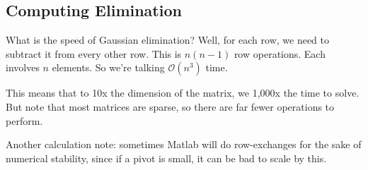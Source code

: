 \subsection{Computing Elimination}

What is the speed of Gaussian elimination? Well, for each row, we need
to subtract it from every other row. This is $n(n-1)$ row operations.
Each involves $n$ elements. So we're talking $\mathcal{O}(n^3)$ time.

This means that to 10x the dimension of the matrix, we 1,000x the time
to solve. But note that most matrices are sparse, so there are far
fewer operations to perform.

Another calculation note: sometimes Matlab will do row-exchanges for
the sake of numerical stability, since if a pivot is small, it can be
bad to scale by this.
